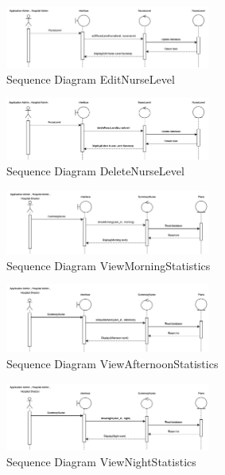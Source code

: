     \begin{figure}[h]
    \centering
    \includegraphics[width=0.6\textwidth]{Sequence 10.3.png}
    \caption{Sequence Diagram EditNurseLevel}
    \end{figure}

    \begin{figure}[h]
    \centering
    \includegraphics[width=0.6\textwidth]{Sequence 10.4.png}
    \caption{Sequence Diagram DeleteNurseLevel}
    \end{figure}


\begin{figure}[h]
    \centering
    \includegraphics[width=0.6\textwidth]{Sequence 11.1.png}
    \caption{Sequence Diagram ViewMorningStatistics}
    \end{figure}

    \begin{figure}[h]
    \centering
    \includegraphics[width=0.6\textwidth]{Sequence 11.2.png}
    \caption{Sequence Diagram ViewAfternoonStatistics}
    \end{figure}

    \begin{figure}[h]
    \centering
    \includegraphics[width=0.6\textwidth]{Sequence 11.3.png}
    \caption{Sequence Diagram ViewNightStatistics}
    \end{figure}

